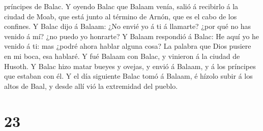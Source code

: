 príncipes de Balac.  Y oyendo Balac que Balaam venía,
salió á recibirlo á la ciudad de Moab, que está junto al término de
Arnón, que es el cabo de los confines.  Y Balac dijo á
Balaam: ¿No envié yo á ti á llamarte? ¿por qué no has venido á mí? ¿no
puedo yo honrarte?  Y Balaam respondió á Balac: He aquí
yo he venido á ti: mas ¿podré ahora hablar alguna cosa? La palabra que
Dios pusiere en mi boca, esa hablaré.  Y fué Balaam con
Balac, y vinieron á la ciudad de Husoth.  Y Balac hizo
matar bueyes y ovejas, y envió á Balaam, y á los príncipes que estaban
con él.  Y el día siguiente Balac tomó á Balaam, é hízolo
subir á los altos de Baal, y desde allí vió la extremidad del pueblo.

\hypertarget{section-22}{%
\section{23}\label{section-22}}

